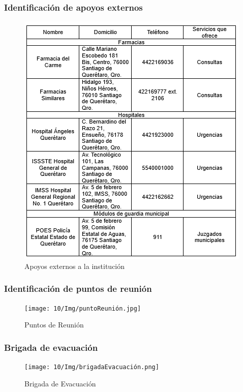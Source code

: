 \subsubsection{ Identificación de apoyos externos}

\begin{figure}[H]
    \centering
    \includegraphics[scale=0.4]{10/Img/apoyos.png}
    \caption{Apoyos externos a la institución}
    \label{fig:apoyos.png}
\end{figure}
%
%
\subsubsection{Identificación de puntos de reunión}

\begin{figure}[H]
        \centering
        \texttt{[image: 10/Img/puntoReunión.jpg]}
        \caption{Puntos de Reunión}
        \label{Puntos de Reunión}
    \end{figure}
%
%
\subsubsection{Brigada de evacuación}

\begin{figure}[H]
    \centering
    \texttt{[image: 10/Img/brigadaEvacuación.png]}
    \caption{Brigada de Evacuación}
    \label{fig:brigadaEvacuación.png}
\end{figure}
%
%
